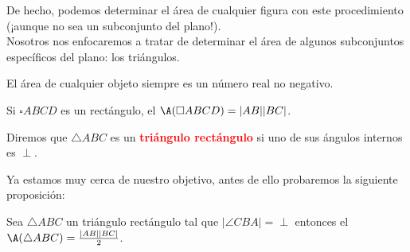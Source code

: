 De hecho, podemos determinar el área de cualquier figura con este procedimiento (¡aunque no sea un subconjunto del plano!).\\




Nosotros nos enfocaremos a tratar de determinar el área de algunos subconjuntos específicos del plano: los triángulos.

\begin{obs}
El área de cualquier objeto siempre es un número real no negativo.
\end{obs}
\begin{obs}\label{ob2}
Si $\square ABCD$ es un rectángulo, el $\A(\square ABCD)= |AB||BC|$.
\end{obs}

\begin{df}
Diremos que $\triangle ABC$ es un \textcolor{red}{\bf triángulo rectángulo} si uno de sus ángulos internos es $\perp$.
\end{df}

Ya estamos muy cerca de nuestro objetivo, antes de ello probaremos la siguiente proposición:

\begin{prop}\label{prop1}
Sea $ \triangle ABC$ un triángulo rectángulo tal que $|\angle CBA|= \perp $ entonces el $\A(\triangle ABC)= \frac{|AB||BC|}{2}$.
\end{prop}


